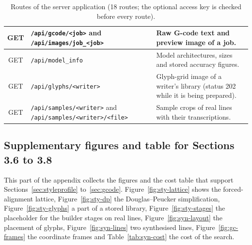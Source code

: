 \begin{table}[h]
\begin{tabularx}{\linewidth}{|c|p{4.0cm}|X|}
\hline
GET & \texttt{/\allowbreak api/\allowbreak gcode/\allowbreak <job>} and \texttt{/\allowbreak api/\allowbreak images/\allowbreak job\_<job>} & Raw G-code text and preview image of a job. \\
\hline
GET & \texttt{/\allowbreak api/\allowbreak model\_info} & Model architectures, sizes and stored accuracy figures. \\
\hline
GET & \texttt{/\allowbreak api/\allowbreak glyphs/\allowbreak <writer>} & Glyph-grid image of a writer's library (status 202 while it is being prepared). \\
\hline
GET & \texttt{/\allowbreak api/\allowbreak samples/\allowbreak <writer>} and \texttt{/\allowbreak api/\allowbreak samples/\allowbreak <writer>/\allowbreak <file>} & Sample crops of real lines with their transcriptions. \\
\hline
\end{tabularx}
\caption{Routes of the server application (18 routes; the optional access key is checked before every route).}
\label{tab:sys-endpoints}
\end{table}

\subsection{Supplementary figures and table for Sections 3.6 to 3.8}

This part of the appendix collects the figures and the cost table that support Sections~\ref{sec:styleprofile} to~\ref{sec:gcode}.
Figure~\ref{fig:sty-lattice} shows the forced-alignment lattice, Figure~\ref{fig:sty-dp} the Douglas--Peucker simplification, Figure~\ref{fig:sty-glyphs} a part of a stored library, Figure~\ref{fig:sty-stages} the placeholder for the builder stages on real lines, Figure~\ref{fig:syn-layout} the placement of glyphs, Figure~\ref{fig:syn-lines} two synthesised lines, Figure~\ref{fig:gc-frames} the coordinate frames and Table~\ref{tab:syn-cost} the cost of the search.

